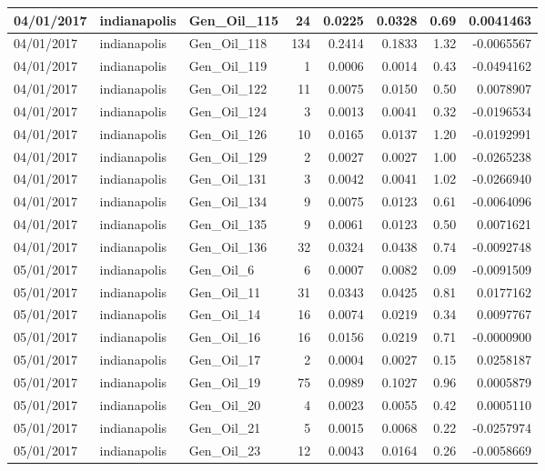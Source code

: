 \documentclass[
  letterpaper,
  DIV=11,
  numbers=noendperiod]{scrartcl}
\begin{document}
\begin{tabular}{l|l|l|r|r|r|r|r}
\hline
04/01/2017 & indianapolis & Gen\_Oil\_115 & 24 & 0.0225 & 0.0328 & 0.69 & 0.0041463\\
\hline
04/01/2017 & indianapolis & Gen\_Oil\_118 & 134 & 0.2414 & 0.1833 & 1.32 & -0.0065567\\
\hline
04/01/2017 & indianapolis & Gen\_Oil\_119 & 1 & 0.0006 & 0.0014 & 0.43 & -0.0494162\\
\hline
04/01/2017 & indianapolis & Gen\_Oil\_122 & 11 & 0.0075 & 0.0150 & 0.50 & 0.0078907\\
\hline
04/01/2017 & indianapolis & Gen\_Oil\_124 & 3 & 0.0013 & 0.0041 & 0.32 & -0.0196534\\
\hline
04/01/2017 & indianapolis & Gen\_Oil\_126 & 10 & 0.0165 & 0.0137 & 1.20 & -0.0192991\\
\hline
04/01/2017 & indianapolis & Gen\_Oil\_129 & 2 & 0.0027 & 0.0027 & 1.00 & -0.0265238\\
\hline
04/01/2017 & indianapolis & Gen\_Oil\_131 & 3 & 0.0042 & 0.0041 & 1.02 & -0.0266940\\
\hline
04/01/2017 & indianapolis & Gen\_Oil\_134 & 9 & 0.0075 & 0.0123 & 0.61 & -0.0064096\\
\hline
04/01/2017 & indianapolis & Gen\_Oil\_135 & 9 & 0.0061 & 0.0123 & 0.50 & 0.0071621\\
\hline
04/01/2017 & indianapolis & Gen\_Oil\_136 & 32 & 0.0324 & 0.0438 & 0.74 & -0.0092748\\
\hline
05/01/2017 & indianapolis & Gen\_Oil\_6 & 6 & 0.0007 & 0.0082 & 0.09 & -0.0091509\\
\hline
05/01/2017 & indianapolis & Gen\_Oil\_11 & 31 & 0.0343 & 0.0425 & 0.81 & 0.0177162\\
\hline
05/01/2017 & indianapolis & Gen\_Oil\_14 & 16 & 0.0074 & 0.0219 & 0.34 & 0.0097767\\
\hline
05/01/2017 & indianapolis & Gen\_Oil\_16 & 16 & 0.0156 & 0.0219 & 0.71 & -0.0000900\\
\hline
05/01/2017 & indianapolis & Gen\_Oil\_17 & 2 & 0.0004 & 0.0027 & 0.15 & 0.0258187\\
\hline
05/01/2017 & indianapolis & Gen\_Oil\_19 & 75 & 0.0989 & 0.1027 & 0.96 & 0.0005879\\
\hline
05/01/2017 & indianapolis & Gen\_Oil\_20 & 4 & 0.0023 & 0.0055 & 0.42 & 0.0005110\\
\hline
05/01/2017 & indianapolis & Gen\_Oil\_21 & 5 & 0.0015 & 0.0068 & 0.22 & -0.0257974\\
\hline
05/01/2017 & indianapolis & Gen\_Oil\_23 & 12 & 0.0043 & 0.0164 & 0.26 & -0.0058669\\

\end{tabular}
\end{document}
